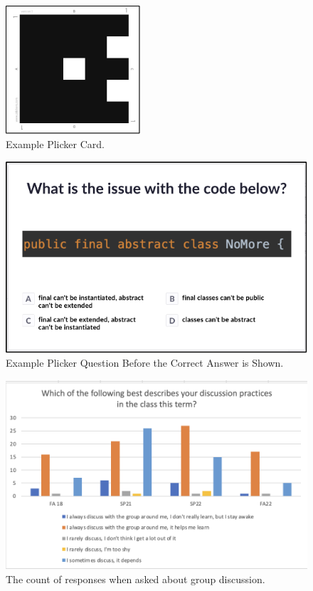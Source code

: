 \documentclass[12pt]{article}
\begin{document}
\begin{figure}[ht]
  \centering
  \includegraphics[width=50mm,scale=0.5]{plicker_card.png}
  \caption{Example Plicker Card.}
  \label{fig:plicker_card}
\end{figure}
\begin{figure}[ht]
  \includegraphics[width=\linewidth]{plicker_question.png}
  \caption{Example Plicker Question Before the Correct Answer is Shown.}
  \label{fig:plicker_question}
\end{figure}

\begin{figure}[ht]
  \includegraphics[width=\linewidth]{count_discussion.png}
  \caption{The count of responses when asked about group discussion.}
  \label{fig:group_discussion}
\end{figure}
\end{document}
